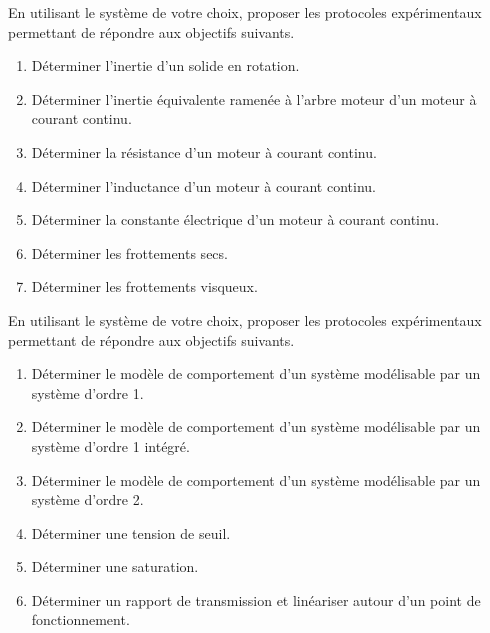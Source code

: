 \documentclass[10pt,fleqn]{article} %
\begin{document}

\vspace{4.5cm}
\pagestyle{fancy}
\thispagestyle{plain}


\def\columnseprulecolor{\color{ocre}}
\setlength{\columnseprule}{0.4pt} 

\begin{multicols}{2}

En utilisant le système de votre choix, proposer les protocoles expérimentaux permettant de répondre aux objectifs suivants.
\begin{enumerate}
\item Déterminer l'inertie d'un solide en rotation.
\item Déterminer l'inertie équivalente ramenée à l'arbre moteur d'un moteur à courant continu.
\item Déterminer la résistance d'un moteur à courant continu.
\item Déterminer l'inductance d'un moteur à courant continu.
\item Déterminer la constante électrique d'un moteur à courant continu.
\item Déterminer les frottements secs.
\item Déterminer les frottements visqueux.
\end{enumerate}

En utilisant le système de votre choix, proposer les protocoles expérimentaux permettant de répondre aux objectifs suivants.
\begin{enumerate}
\item Déterminer le modèle de comportement d'un système modélisable par un système d'ordre 1.
\item Déterminer le modèle de comportement d'un système modélisable par un système d'ordre 1 intégré.
\item Déterminer le modèle de comportement d'un système modélisable par un système d'ordre 2.
\item Déterminer une tension de seuil.
\item Déterminer une saturation.
\item Déterminer un rapport de transmission et linéariser autour d'un point de fonctionnement.
\end{enumerate}


\end{multicols}
\end{document}
